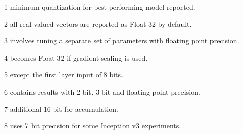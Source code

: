\begin{table}
\begin{threeparttable}[tb]
\begin{scriptsize}
\begin{tablenotes}
 \item[1] minimum quantization for best performing model reported.
 \item[2] all real valued vectors are reported as Float 32 by default.
 \item[3] involves tuning a separate set of parameters with floating point precision.
 \item[4] becomes Float 32 if gradient scaling is used.
 \item[5] except the first layer input of 8 bits.
 \item[6] contains results with 2 bit, 3 bit and floating point precision.
 \item[7] additional 16 bit for accumulation.
 \item[8] uses 7 bit precision for some Inception v3 experiments.
\end{tablenotes}
\end{scriptsize}
\end{threeparttable}
\end{table}